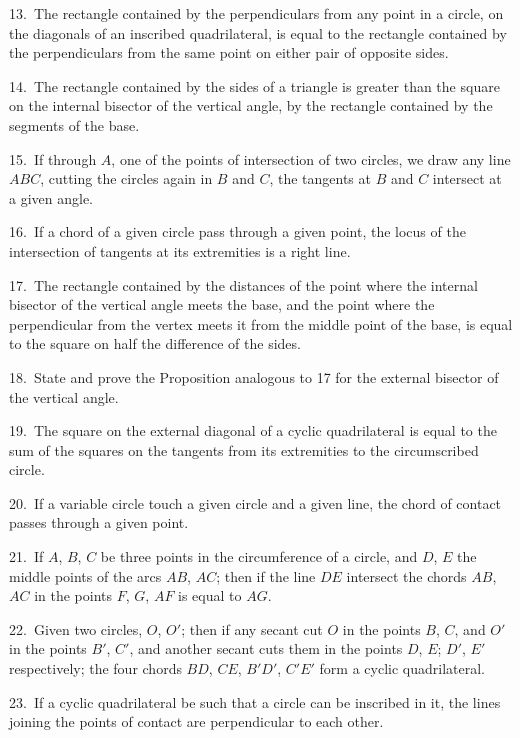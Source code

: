 \documentclass[oneside]{book}
\begin{document}
\begin{footnotesize}
13.~The rectangle contained by the perpendiculars from any
point in a circle, on the diagonals of an inscribed quadrilateral, is
equal to the rectangle contained by the perpendiculars from the
same point on either pair of opposite sides.

14.~The rectangle contained by the sides of a triangle is
greater than the square on the internal bisector of the vertical
angle, by the rectangle contained by the segments of the base.

15.~If through $A$, one of the points of intersection of two
circles, we draw any line $ABC$, cutting the circles again in
$B$ and $C$, the tangents at $B$ and $C$ intersect at a given angle.

16.~If a chord of a given circle pass through a given point, the
locus of the intersection of tangents at its extremities is a right
line.

17.~The rectangle contained by the distances of the point where
the internal bisector of the vertical angle meets the base, and the
point where the perpendicular from the vertex meets it from the
middle point of the base, is equal to the square on half the difference
of the sides.

18.~State and prove the Proposition analogous to 17 for the
external bisector of the vertical angle.

19.~The square on the external diagonal of a cyclic quadrilateral
is equal to the sum of the squares on the tangents from
its extremities to the circumscribed circle.

20.~If a variable circle touch a given circle and a given line,
the chord of contact passes through a given point.

21.~If $A$, $B$, $C$ be three points in the circumference of a circle,
and $D$, $E$ the middle points of the arcs $AB$, $AC$; \label{theifthen}then if the line
$DE$ intersect the chords $AB$, $AC$ in the points $F$, $G$, $AF$ is equal
to $AG$.

22.~Given two circles, $O$, $O'$; then if any secant cut $O$ in the
points $B$, $C$, and $O'$ in the points $B'$, $C'$, and another secant cuts
them in the points $D$, $E$; $D'$, $E'$ respectively; the four chords
$BD$, $CE$, $B'D'$, $C'E'$ form a cyclic quadrilateral.

23.~If a cyclic quadrilateral be such that a circle can be
inscribed in it, the lines joining the points of contact are perpendicular
to each other.


\end{footnotesize}
\end{document}
